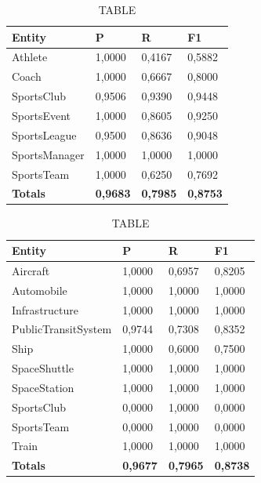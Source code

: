 \documentclass[thesis=M,english]{FITthesis}[2018/05/30]
\begin{document}
	\begin{table}[H]\centering
		\caption{TABLE}
		\label{}
		\begin{tabular}{|l|l|l|l|}
			\hline {\textbf{Entity}} & {\textbf{P}} & {\textbf{R}} & {\textbf{F1}}\\\hline
				Athlete & 1,0000 & 0,4167 & 0,5882\\
				Coach & 1,0000 & 0,6667 & 0,8000\\
				SportsClub & 0,9506 & 0,9390 & 0,9448\\
				SportsEvent & 1,0000 & 0,8605 & 0,9250\\
				SportsLeague & 0,9500 & 0,8636 & 0,9048\\
				SportsManager & 1,0000 & 1,0000 & 1,0000\\				
				SportsTeam & 1,0000 & 0,6250 & 0,7692\\\hline
				\textbf{Totals} & \textbf{0,9683} & \textbf{0,7985} & \textbf{0,8753}\\\hline
		\end{tabular}
	\end{table}	

	\begin{table}[H]\centering
		\caption{TABLE}
		\label{}
		\begin{tabular}{|l|l|l|l|}
			\hline {\textbf{Entity}} & {\textbf{P}} & {\textbf{R}} & {\textbf{F1}}\\\hline
				Aircraft & 1,0000 & 0,6957 & 0,8205\\
				Automobile & 1,0000 & 1,0000 & 1,0000\\				
				Infrastructure & 1,0000 & 1,0000 & 1,0000\\
				PublicTransitSystem & 0,9744 & 0,7308 & 0,8352\\
				Ship & 1,0000 & 0,6000 & 0,7500\\				
				SpaceShuttle & 1,0000 & 1,0000 & 1,0000\\
				SpaceStation & 1,0000 & 1,0000 & 1,0000\\
				SportsClub & 0,0000 & 1,0000 & 0,0000\\
				SportsTeam & 0,0000 & 1,0000 & 0,0000\\
				Train & 1,0000 & 1,0000 & 1,0000\\\hline
				\textbf{Totals} & \textbf{0,9677} & \textbf{0,7965} & \textbf{0,8738}\\\hline
		\end{tabular}
	\end{table}		
	
\end{document}
